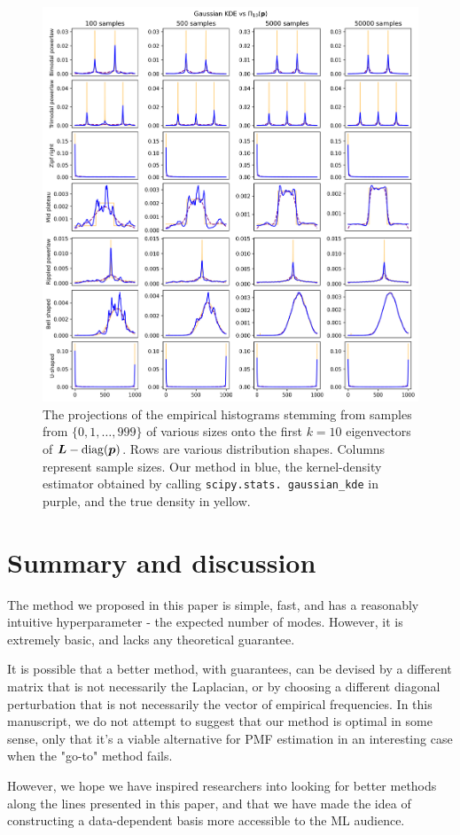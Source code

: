 \documentclass[10pt]{article} %
\DeclareMathOperator{\diag}{diag}
\begin{document}
\begin{figure}[tbh]
    \centering
    \includegraphics[width=\textwidth]{proj_diff_samples.png}
    \caption{The projections of the empirical histograms stemming from  samples from $\{0, 1, \dots, 999\}$ of various sizes onto the first $k=10$ eigenvectors of $\mL - \diag(\vp)$. Rows are various distribution shapes. Columns represent sample sizes. Our method in blue, the kernel-density estimator obtained by calling \texttt{scipy.stats.
    gaussian\_kde} in purple, and the true density in yellow.}
    \label{fig:apx_sample_sizes}
\end{figure}


\section{Summary and discussion}
The method we proposed in this paper is simple, fast, and has a reasonably intuitive hyperparameter - the expected number of modes. However, it is extremely basic, and lacks any theoretical guarantee.

It is possible that a better method, with guarantees, can be devised by a different matrix that is not necessarily the Laplacian, or by choosing a different diagonal perturbation that is not necessarily the vector of empirical frequencies. In this manuscript, we do not attempt to suggest that our method is optimal in some sense, only that it's a viable alternative for PMF estimation in an interesting case when the "go-to" method fails.

However, we hope we have inspired researchers into looking for better methods along the lines presented in this paper, and that we have made the idea of constructing a data-dependent basis more accessible to the ML audience.



\end{document}
